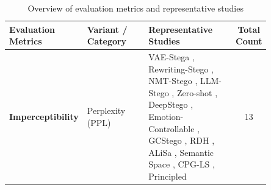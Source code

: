 \iffalse
\begin{table}[ht]
  \centering
  \footnotesize
  \caption{Overview of evaluation metrics and representative studies}
  \label{tab:evaluation_metrics_overview}
  \begin{tabular}{|>{\raggedright\arraybackslash}p{0.25\linewidth}|>{\raggedright\arraybackslash}p{0.25\linewidth}|>{\raggedright\arraybackslash}p{0.35\linewidth}|c|}
    \hline
    \textbf{Evaluation Metrics} & \textbf{Variant / Category}         & \textbf{Representative Studies}                                                                                                                                                                                                                                                                                                                                                                                                                                                                                                                                                                                                                                                                                                                                                                                                                                                                                                                                                                  & \textbf{Total Count} \\
    \hline
    \textbf{Imperceptibility}   & Perplexity (PPL)                    & VAE-Stega \cite{yang2020vae}, Rewriting-Stego \cite{li2023rewriting}, NMT-Stego \cite{ding2023context}, LLM-Stego \cite{wu2024generative}, Zero-shot \cite{lin2024zero}, DeepStego \cite{kuznetsov2025deepstego}, Emotion-Controllable \cite{shi2025emotionally}, GCStego \cite{liao2024co}, RDH \cite{zheng2022general}, ALiSa \cite{yi2022alisa}, Semantic Space \cite{zhang2020linguistic}, CPG-LS \cite{xiang2023cpg}, Principled \cite{ji2024principled}                                                                                                                                                                                                                                                                                                                                                                                                                                                                                                                                    & 13                   \\

\end{tabular}
\end{table}
